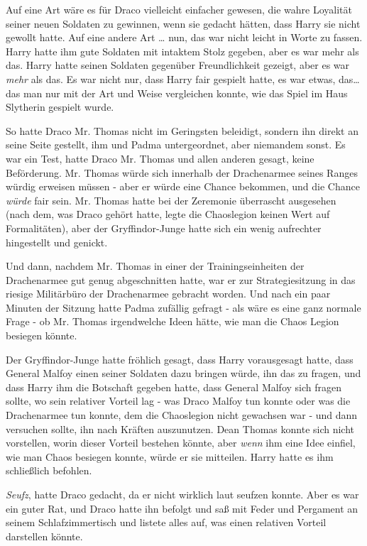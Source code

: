 {Auf eine Art wäre es für Draco vielleicht einfacher gewesen, die wahre Loyalität seiner neuen Soldaten zu gewinnen, wenn sie gedacht hätten, dass Harry sie nicht gewollt hatte. Auf eine andere Art … nun, das war nicht leicht in Worte zu fassen. Harry hatte ihm gute Soldaten mit intaktem Stolz gegeben, aber es war mehr als das. Harry hatte seinen Soldaten gegenüber Freundlichkeit gezeigt, aber es war \emph{mehr} als das. Es war nicht nur, dass Harry fair gespielt hatte, es war etwas, das… das man nur mit der Art und Weise vergleichen konnte, wie das Spiel im Haus Slytherin gespielt wurde.

So hatte Draco Mr. Thomas nicht im Geringsten beleidigt, sondern ihn direkt an seine Seite gestellt, ihm und Padma untergeordnet, aber niemandem sonst. Es war ein Test, hatte Draco Mr. Thomas und allen anderen gesagt, keine Beförderung. Mr. Thomas würde sich innerhalb der Drachenarmee seines Ranges würdig erweisen müssen - aber er würde eine Chance bekommen, und die Chance \emph{würde} fair sein. Mr. Thomas hatte bei der Zeremonie überrascht ausgesehen (nach dem, was Draco gehört hatte, legte die Chaoslegion keinen Wert auf Formalitäten), aber der Gryffindor-Junge hatte sich ein wenig aufrechter hingestellt und genickt.

Und dann, nachdem Mr. Thomas in einer der Trainingseinheiten der Drachenarmee gut genug abgeschnitten hatte, war er zur Strategiesitzung in das riesige Militärbüro der Drachenarmee gebracht worden. Und nach ein paar Minuten der Sitzung hatte Padma zufällig gefragt - als wäre es eine ganz normale Frage - ob Mr. Thomas irgendwelche Ideen hätte, wie man die Chaos Legion besiegen könnte.

Der Gryffindor-Junge hatte fröhlich gesagt, dass Harry vorausgesagt hatte, dass General Malfoy einen seiner Soldaten dazu bringen würde, ihn das zu fragen, und dass Harry ihm die Botschaft gegeben hatte, dass General Malfoy sich fragen sollte, wo sein relativer Vorteil lag - was Draco Malfoy tun konnte oder was die Drachenarmee tun konnte, dem die Chaoslegion nicht gewachsen war - und dann versuchen sollte, ihn nach Kräften auszunutzen. Dean Thomas konnte sich nicht vorstellen, worin dieser Vorteil bestehen könnte, aber \emph{wenn} ihm eine Idee einfiel, wie man Chaos besiegen konnte, würde er sie mitteilen. Harry hatte es ihm schließlich befohlen.

\emph{Seufz}, hatte Draco gedacht, da er nicht wirklich laut seufzen konnte. Aber es war ein guter Rat, und Draco hatte ihn befolgt und saß mit Feder und Pergament an seinem Schlafzimmertisch und listete alles auf, was einen relativen Vorteil darstellen könnte.

}
